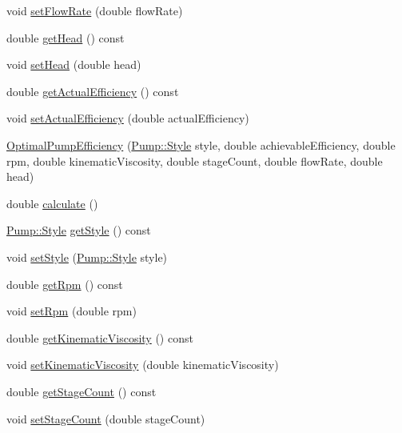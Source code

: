 \begin{DoxyCompactItemize}
void \hyperlink{class_optimal_pump_efficiency_a90067b57c559fd3274fb8d6e00f6221d}{set\+Flow\+Rate} (double flow\+Rate)
\item 
double \hyperlink{class_optimal_pump_efficiency_af31fdb10aabc197ff7536c9bbe006573}{get\+Head} () const
\item 
void \hyperlink{class_optimal_pump_efficiency_ac317c900ec68797cf051977147ea33da}{set\+Head} (double head)
\item 
double \hyperlink{class_optimal_pump_efficiency_aa2ac8a7c61bc28f82e30cb44b9c21008}{get\+Actual\+Efficiency} () const
\item 
void \hyperlink{class_optimal_pump_efficiency_a539b20c53c7ba6a5983a60d74be4ac9e}{set\+Actual\+Efficiency} (double actual\+Efficiency)
\item 
\hyperlink{class_optimal_pump_efficiency_ae07626ea079ff810ac6518d54c52b24a}{Optimal\+Pump\+Efficiency} (\hyperlink{class_pump_aef354601ce4218258cc898b35a1e90ff}{Pump\+::\+Style} style, double achievable\+Efficiency, double rpm, double kinematic\+Viscosity, double stage\+Count, double flow\+Rate, double head)
\item 
double \hyperlink{class_optimal_pump_efficiency_ac40720d1fcdf40d8b364df37e58e7f4d}{calculate} ()
\item 
\hyperlink{class_pump_aef354601ce4218258cc898b35a1e90ff}{Pump\+::\+Style} \hyperlink{class_optimal_pump_efficiency_a601fe15e9acc23112743fabe417030fb}{get\+Style} () const
\item 
void \hyperlink{class_optimal_pump_efficiency_ab6b85c8c08d6641c5375c65436f16a2f}{set\+Style} (\hyperlink{class_pump_aef354601ce4218258cc898b35a1e90ff}{Pump\+::\+Style} style)
\item 
double \hyperlink{class_optimal_pump_efficiency_a58e8a430ced612e0518abd07fb30b085}{get\+Rpm} () const
\item 
void \hyperlink{class_optimal_pump_efficiency_afc6b6f46b4e289efc8819249ad1c9fb5}{set\+Rpm} (double rpm)
\item 
double \hyperlink{class_optimal_pump_efficiency_a8c2f7fcacce2b42ed83f29aec2d4671e}{get\+Kinematic\+Viscosity} () const
\item 
void \hyperlink{class_optimal_pump_efficiency_a00017e0bd100beb2f4b0bf2db5e3687f}{set\+Kinematic\+Viscosity} (double kinematic\+Viscosity)
\item 
double \hyperlink{class_optimal_pump_efficiency_aac0c1a4a6492bf00b245c2a61d100eaa}{get\+Stage\+Count} () const
\item 
void \hyperlink{class_optimal_pump_efficiency_a5b0b2a24a87c1c8fc92aa96c6ba4b727}{set\+Stage\+Count} (double stage\+Count)

\end{DoxyCompactItemize}
